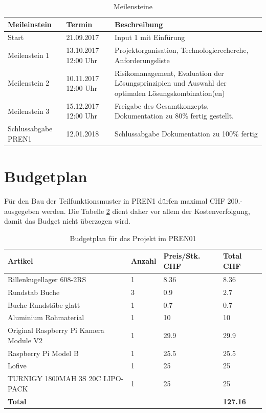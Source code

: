 \documentclass[a4paper]{report}
\begin{document}
\begin{table}[h!]
\vspace{1em}
\noindent
\begin{tabular}{|p{}|p{}|p{}|}
	\hline
	\textbf{Meileinstein} & \textbf{Termin} & \textbf{Beschreibung} \\
	\hline
	Start & 21.09.2017 & Input 1 mit Einfürung \\
	\hline
	Meilenstein 1 & 13.10.2017 12:00 Uhr & Projektorganisation, Technologierecherche, Anforderungsliste \\
	\hline
	Meilenstein 2 & 10.11.2017 12:00 Uhr & Risikomanagement, Evaluation der Lösungsprinzipien und Auswahl der optimalen Lösungskombination(en) \\
	\hline
	Meilenstein 3 & 15.12.2017 12:00 Uhr & Freigabe des Gesamtkonzepts, Dokumentation zu 80\% fertig gestellt. \\
	\hline
	Schlussabgabe PREN1 &12.01.2018 & Schlussabgabe Dokumentation zu 100\% fertig \\
	\hline
	\end{tabular}
	\caption{Meilensteine}
	\label{tab:Meilensteine}
\end{table}

\newpage

\section{Budgetplan}
\label{sec:Budgetplan}
Für den Bau der Teilfunktionsmuster in PREN1 dürfen maximal CHF 200.- ausgegeben werden. Die Tabelle \ref{tab:Budgetplan} dient daher vor allem der Kostenverfolgung, damit das Budget nicht überzogen wird.

\vspace{1em}
\noindent
\begin{table}[h]
	\begin{tabular}{|p{}|p{}|p{}||p{}|}
	\hline
	\textbf{Artikel} & \textbf{Anzahl} & \textbf{Preis/Stk. CHF} & \textbf{Total CHF} \\
	\hline
	Rillenkugellager 608-2RS & 1 & 8.36 & 8.36 \\
	\hline
	Rundstab Buche & 3 & 0.9 & 2.7 \\
	\hline
	Buche Rundstäbe glatt & 1 & 0.7 & 0.7 \\
	\hline
	Aluminium Rohmaterial & 1 & 10 & 10 \\
	\hline
	Original Raspberry Pi Kamera Module V2 & 1 & 29.9 & 29.9 \\
	\hline
	Raspberry Pi Model B & 1 & 25.5 & 25.5 \\
	\hline
	Lofive & 1 & 25 & 25 \\
	\hline
	TURNIGY 1800MAH 3S 20C LIPO-PACK & 1 & 25 & 25\\
	\hline
	\textbf{Total} & & & \textbf{127.16} \\
	\hline
	\end{tabular}
	\caption{Budgetplan für das Projekt im PREN01}
	\label{tab:Budgetplan}
\end{table}
\end{document}
